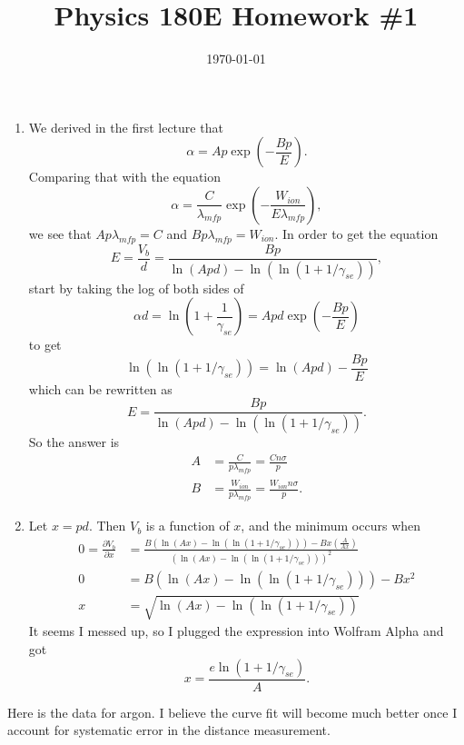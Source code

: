 \documentclass{article}
\date{\today}
\title{Physics 180E Homework \#1}
\begin{document}
\maketitle

\begin{prob}
\end{prob}
\begin{enumerate}[label=(\alph*)]
    \item We derived in the first lecture that
        \[ \alpha = A p \exp \left( - \frac{Bp}{E}\right). \]
        Comparing that with the equation
        \[ \alpha = \frac{C}{\lambda_{mfp}} \exp \left( - \frac{W_{ion}}{E\lambda_{mfp}} \right), \]
        we see that $A p \lambda_{mfp} = C$ and $B p \lambda_{mfp} = W_{ion}$. In order to get the equation
        \[ E = \frac{V_b}{d} = \frac{Bp}{\ln (Apd) - \ln(\ln(1+1/\gamma_{se}))}, \]
        start by taking the log of both sides of
        \[ \alpha d = \ln \left( 1 + \frac{1}{\gamma_{se}} \right) = Apd \exp \left( - \frac{Bp}{E} \right) \]
        to get
        \[ \ln ( \ln ( 1 + 1/\gamma_{se} ) ) = \ln(Apd) - \frac{Bp}{E} \]
        which can be rewritten as
        \[ E = \frac{Bp}{\ln (Apd) - \ln(\ln(1+1/\gamma_{se}))}. \]
        So the answer is \begin{align*}
            A &= \frac{C}{p \lambda_{mfp}} = \frac{Cn\sigma}{p} \\
            B &= \frac{W_{ion}}{p \lambda_{mfp}} = \frac{W_{ion}n\sigma}{p}.
        \end{align*}
    \item Let $x=pd$. Then $V_b$ is a function of $x$, and the minimum occurs when
        \begin{align*}
            0 = \frac{\partial V_b}{\partial x} &= \frac{B (\ln(Ax)-\ln(\ln(1+1/\gamma_{se})))-Bx \left( \frac{A}{Ax} \right) }{(\ln(Ax)-\ln(\ln(1+1/\gamma_{se})))^2} \\
            0 &= B (\ln(Ax)-\ln(\ln(1+1/\gamma_{se})))-Bx^2 \\
        x &= \sqrt{\ln(Ax)-\ln(\ln(1+1/\gamma_{se}))}
        \end{align*}
        It seems I messed up, so I plugged the expression into Wolfram Alpha and got
        \[ x = \frac{e \ln \left( 1 + 1/\gamma_{se} \right) }{A}. \]
    
\end{enumerate}

\bigskip
\par
\begin{prob}
\end{prob}
Here is the data for argon. I believe the curve fit will become much better once I account for systematic error in the distance measurement.


\end{document}
